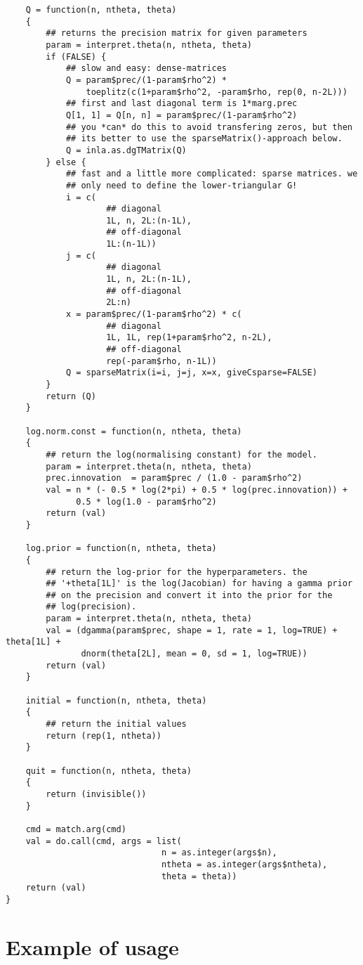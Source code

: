 \documentclass[a4paper,11pt]{article}
\begin{document}
\begin{verbatim}
    Q = function(n, ntheta, theta)
    {
        ## returns the precision matrix for given parameters
        param = interpret.theta(n, ntheta, theta)
        if (FALSE) {
            ## slow and easy: dense-matrices
            Q = param$prec/(1-param$rho^2) *
                toeplitz(c(1+param$rho^2, -param$rho, rep(0, n-2L)))
            ## first and last diagonal term is 1*marg.prec
            Q[1, 1] = Q[n, n] = param$prec/(1-param$rho^2)
            ## you *can* do this to avoid transfering zeros, but then
            ## its better to use the sparseMatrix()-approach below.
            Q = inla.as.dgTMatrix(Q)
        } else {
            ## fast and a little more complicated: sparse matrices. we
            ## only need to define the lower-triangular G!
            i = c(
                    ## diagonal
                    1L, n, 2L:(n-1L),
                    ## off-diagonal
                    1L:(n-1L))
            j = c(
                    ## diagonal
                    1L, n, 2L:(n-1L),
                    ## off-diagonal
                    2L:n)
            x = param$prec/(1-param$rho^2) * c(
                    ## diagonal
                    1L, 1L, rep(1+param$rho^2, n-2L),
                    ## off-diagonal
                    rep(-param$rho, n-1L))
            Q = sparseMatrix(i=i, j=j, x=x, giveCsparse=FALSE)
        }            
        return (Q)
    }

    log.norm.const = function(n, ntheta, theta)
    {
        ## return the log(normalising constant) for the model.
        param = interpret.theta(n, ntheta, theta)
        prec.innovation  = param$prec / (1.0 - param$rho^2)
        val = n * (- 0.5 * log(2*pi) + 0.5 * log(prec.innovation)) +
              0.5 * log(1.0 - param$rho^2)
        return (val)
    }

    log.prior = function(n, ntheta, theta)
    {
        ## return the log-prior for the hyperparameters. the
        ## '+theta[1L]' is the log(Jacobian) for having a gamma prior
        ## on the precision and convert it into the prior for the
        ## log(precision).
        param = interpret.theta(n, ntheta, theta)
        val = (dgamma(param$prec, shape = 1, rate = 1, log=TRUE) + theta[1L] + 
               dnorm(theta[2L], mean = 0, sd = 1, log=TRUE))
        return (val)
    }

    initial = function(n, ntheta, theta)
    {
        ## return the initial values
        return (rep(1, ntheta))
    }

    quit = function(n, ntheta, theta)
    {
        return (invisible())
    }

    cmd = match.arg(cmd)
    val = do.call(cmd, args = list(
                               n = as.integer(args$n),
                               ntheta = as.integer(args$ntheta), 
                               theta = theta))
    return (val)
}
\end{verbatim}

\section*{Example of usage}


\end{document}
